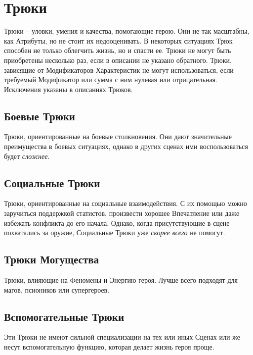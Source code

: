 \section{Трюки}
Трюки – уловки, умения и качества, помогающие герою. Они не так масштабны, как Атрибуты, но не стоит их недооценивать. В некоторых ситуациях Трюк способен не только облегчить жизнь, но и спасти ее. 
\newline Трюки не могут быть приобретены несколько раз, если в описании не указано обратного.
\newline Трюки, зависящие от Модификаторов Характеристик не могут использоваться, если требуемый Модификатор или сумма с ним нулевая или отрицательная. Исключения указаны в описаниях Трюков.

\subsection{Боевые Трюки}
Трюки, ориентированные на боевые столкновения. Они дают значительные преимущества в боевых ситуациях, однако в других сценах ими воспользоваться будет \textit{сложнее}.

\subsection{Социальные Трюки}
Трюки, ориентированные на социальные взаимодействия. С их помощью можно заручиться поддержкой статистов, произвести хорошее Впечатление или даже избежать конфликта до его начала. Однако, когда присутствующие в сцене похватались за оружие, Социальные Трюки уже \textit{скорее всего} не помогут.

\subsection{Трюки Могущества}
Трюки, влияющие на Феномены и Энергию героя. Лучше всего подходят для магов, псиоников или супергероев.

\subsection{Вспомогательные Трюки}
Эти Трюки не имеют сильной специализации на тех или иных Сценах или же несут вспомогательную функцию, которая делает жизнь героя проще.

\printindex[tricks]